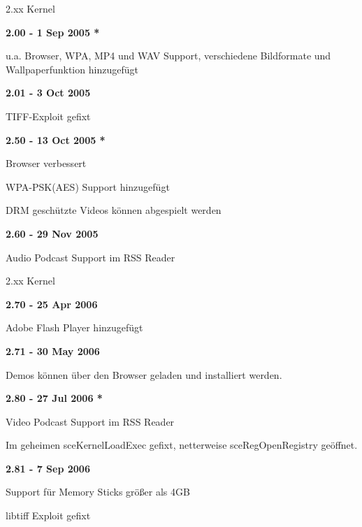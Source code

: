 \documentclass[mode=print,paper=screen,style=jefka]{powerdot}
\begin{document}
\begin{slide}{2.xx Kernel}
	\begin{large}\textbf{2.00 - 1 Sep 2005 *}\end{large}
	\begin{list}{-}{}
		\item{u.a. Browser, WPA, MP4 und WAV Support, verschiedene Bildformate und Wallpaperfunktion hinzugefügt}
	\end{list}
	\begin{large}\textbf{2.01 - 3 Oct 2005}\end{large}
	\begin{list}{-}{}
		\item{TIFF-Exploit gefixt}
	\end{list}
	\begin{large}\textbf{2.50 - 13 Oct 2005 *}\end{large}
	\begin{list}{-}{}
		\item{Browser verbessert}
		\item{WPA-PSK(AES) Support hinzugefügt}
		\item{DRM geschützte Videos können abgespielt werden}
	\end{list}
	\begin{large}\textbf{2.60 - 29 Nov 2005}\end{large}
	\begin{list}{-}{}
		\item{Audio Podcast Support im RSS Reader}
	\end{list}
\end{slide}

\begin{slide}{2.xx Kernel}
	\begin{large}\textbf{2.70 - 25 Apr 2006}\end{large}
	\begin{list}{-}{}
		\item{Adobe Flash Player hinzugefügt}
	\end{list}
	\begin{large}\textbf{2.71 - 30 May 2006}\end{large}
	\begin{list}{-}{}
		\item{Demos können über den Browser geladen und installiert werden.}
	\end{list}
	\begin{large}\textbf{2.80 - 27 Jul 2006 *}\end{large}
	\begin{list}{-}{}
		\item{Video Podcast Support im RSS Reader}
		\item{Im geheimen sceKernelLoadExec gefixt, netterweise sceRegOpenRegistry geöffnet.}
	\end{list}
	\begin{large}\textbf{2.81 - 7 Sep 2006}\end{large}
	\begin{list}{-}{}
		\item{Support für Memory Sticks größer als 4GB}
		\item{libtiff Exploit gefixt}
	\end{list}
\end{slide}
\end{document}
